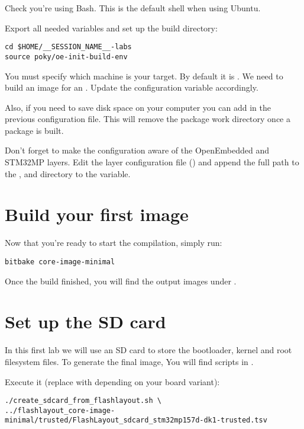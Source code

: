 Check you're using Bash. This is the default shell when using Ubuntu.

Export all needed variables and set up the build directory:
\begin{verbatim}
cd $HOME/__SESSION_NAME__-labs
source poky/oe-init-build-env
\end{verbatim}

You must specify which machine is your target. By default it
is . We need to build an image for an .
Update the  configuration variable accordingly.

Also, if you need to save disk space on your computer you can add  in the previous configuration file. This will remove the
package work directory once a package is built.

Don't forget to make the configuration aware of the OpenEmbedded and
STM32MP layers. Edit the layer configuration file
() and append the full path to the
,  and  directory to the
 variable.

\section{Build your first image}

Now that you're ready to start the compilation, simply run:
\begin{verbatim}
bitbake core-image-minimal
\end{verbatim}

Once the build finished, you will find the output images under
.

\section{Set up the SD card}

In this first lab we will use an SD card to store the bootloader, kernel and
root filesystem files. To generate the final image, You will find scripts in
.

Execute it (replace  with  depending on your board variant):
\begin{verbatim}
./create_sdcard_from_flashlayout.sh \
../flashlayout_core-image-minimal/trusted/FlashLayout_sdcard_stm32mp157d-dk1-trusted.tsv
\end{verbatim}

